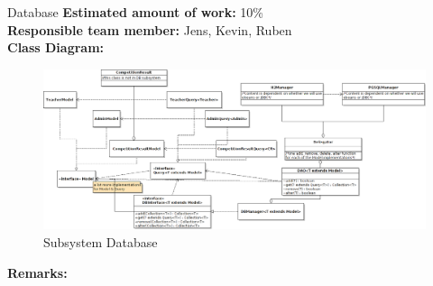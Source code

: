 \begin{subsection}{Database}
	\textbf{Estimated amount of work:} 10\% \\
	\textbf{Responsible team member:} Jens, Kevin, Ruben \\
	\textbf{Class Diagram:} \\
	
	\begin{figure}[!h]
	  \centering
		\includegraphics[width=1\textwidth]{../class_diagrams/database.png}
	  \caption{Subsystem Database}
	  \label{subsystem_database}
	\end{figure}
	
	\textbf{Remarks:} \\
	
\end{subsection}